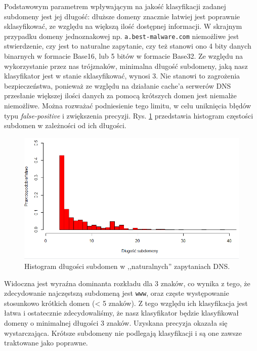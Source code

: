 \documentclass{eiti-raport}
\begin{document}
Podstawowym parametrem wpływającym na jakość klasyfikacji zadanej subdomeny jest jej długość: dłuższe domeny znacznie łatwiej jest poprawnie sklasyfikować, ze względu na większą ilość dostępnej informacji. W skrajnym przypadku domeny jednoznakowej np. \texttt{a.best-malware.com} niemożliwe jest stwierdzenie, czy jest to naturalne zapytanie, czy też stanowi ono 4 bity danych binarnych w formacie Base16, lub 5 bitów w formacie Base32. Ze względu na wykorzystanie przez nas trójznaków, minimalna długość subdomeny, jaką nasz klasyfikator jest w stanie sklasyfikować, wynosi 3. Nie stanowi to zagrożenia bezpieczeństwa, ponieważ ze względu na działanie cache'a serwerów DNS przesłanie większej ilości danych za pomocą krótszych domen jest niemalże niemożliwe. Można rozważać podniesienie tego limitu, w celu uniknięcia błędów typu \emph{false-positive} i zwiększenia precyzji. Rys. \ref{fig:length-hist} przedstawia histogram częstości subdomen w zależności od ich długości. 
\begin{figure}[!h] \centering
	\includegraphics[width=0.9\linewidth]{img/length-hist.PNG}
	\caption{Histogram długości subdomen w ,,naturalnych'' zapytaniach DNS.} \label{fig:length-hist}
\end{figure}
Widoczna jest wyraźna dominanta rozkładu dla 3 znaków, co wynika z tego, że zdecydowanie najczęstszą subdomeną jest \texttt{www}, oraz częste występowanie stosunkowo krótkich domen (< 5 znaków). Z tego względu ich klasyfikacja jest łatwa i ostatecznie zdecydowaliśmy, że nasz klasyfikator będzie klasyfikował domeny o minimalnej długości 3 znaków. Uzyskana precyzja okazała się wystarczająca. Krótsze subdomeny nie podlegają klasyfikacji i są one zawsze traktowane jako poprawne. 
\end{document}

